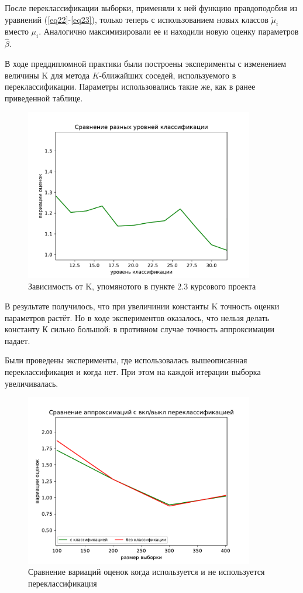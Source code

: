 После переклассификации выборки, применяли к ней функцию правдоподобия из уравнений (\ref{eq22}-\ref{eq23}), только теперь с использованием новых классов $\check{\mu}_i$ вместо $\mu_i$. 
Аналогично максимизировали ее и находили новую оценку параметров $\hat{\beta}$.

В ходе преддипломной практики были построены эксперименты с изменением величины K для метода $K$-ближайших соседей, используемого в переклассификации. Параметры использовались такие же, как в ранее приведенной таблице.
\begin{figure}[h!]
    \centering
    \includegraphics[width=100mm]{../images/different_recl_level.pdf}
    \caption{Зависимость от K, упомянотого в пункте 2.3 курсового проекта\label{overflow}}
    \label{pic1}
\end{figure}

В результате получилось, что при увеличинии константы K точность оценки параметров растёт. Но в ходе экспериментов оказалось, что нельзя делать константу К сильно большой: в противном случае точность аппроксимации падает.

Были проведены эксперименты, где использовалась вышеописанная переклассификация и когда нет. При этом на каждой итерации выборка увеличивалась. 
\begin{figure}[h!]
    \centering
    \includegraphics[width=100mm]{../images/on_off_recl.pdf}
    \caption{Сравнение вариаций оценок когда используется и не используется переклассификация\label{overflow}}
    \label{pic2}
\end{figure}

